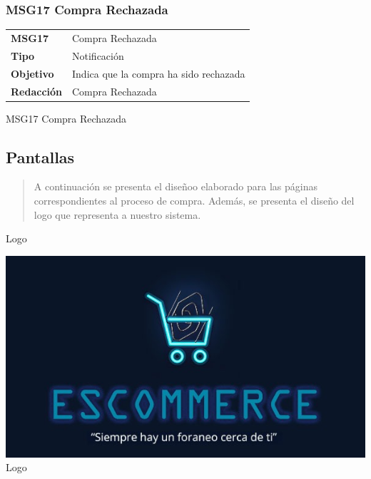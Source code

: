 \documentclass[14pt]{article}
\begin{document}
            \subsubsection{MSG17 Compra Rechazada}\label{MSG17 Compra Rechazada}
                \begin{table}[H]
                    \begin{center}
                        \begin{tabular}{| l | l | } \hline
                        \textbf{MSG17} & Compra Rechazada\\
                        \textbf{Tipo} & Notificación \\
                        \textbf{Objetivo} & Indica que la compra ha sido rechazada\\
                        \textbf{Redacción} & Compra Rechazada \\ \hline
                        \end{tabular}
                        
                        \vspace{0.3cm} MSG17 Compra Rechazada
                    \end{center}
                \end{table}
    \newpage
        \subsection{Pantallas}
            \begin{quote}
                A continuación se presenta el diseñoo elaborado para las páginas correspondientes al proceso de compra. Además, se presenta el diseño del logo que representa a nuestro sistema.
            \end{quote}
            
            \vspace{1cm}
            
            Logo
            \begin{center} \includegraphics[height=0.55\textwidth]{Logo.jpg}
                \label{fig:Logo} \\ [Figura 1] Logo
            \end{center}
            
\end{document}
